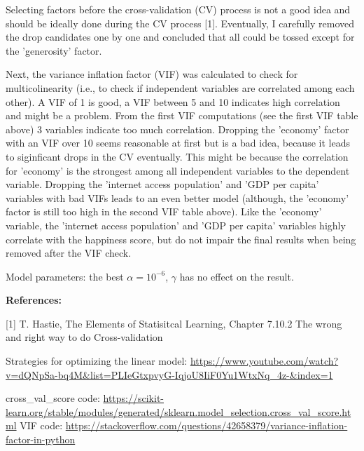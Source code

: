 \documentclass[11pt]{article}
\begin{document}
Selecting factors before the cross-validation (CV) process is not a good
idea and should be ideally done during the CV process {[}1{]}.
Eventually, I carefully removed the drop candidates one by one and
concluded that all could be tossed except for the 'generosity' factor.

Next, the variance inflation factor (VIF) was calculated to check for
multicolinearity (i.e., to check if independent variables are correlated
among each other). A VIF of 1 is good, a VIF between 5 and 10 indicates
high correlation and might be a problem. From the first VIF computations
(see the first VIF table above) 3 variables indicate too much
correlation.\newline
Dropping the 'economy' factor with an VIF over 10 seems reasonable at
first but is a bad idea, because it leads to siginficant drops in the CV
eventually. This might be because the correlation for 'economy' is the
strongest among all independent variables to the dependent variable.
Dropping the 'internet access population' and 'GDP per capita' variables
with bad VIFs leads to an even better model (although, the 'economy'
factor is still too high in the second VIF table above). Like the
'economy' variable, the 'internet access population' and 'GDP per
capita' variables highly correlate with the happiness score, but do not
impair the final results when being removed after the VIF check.\newline

Model parameters: the best \(\alpha = 10^{-6}\), \(\gamma\) has no
effect on the result.\newline

\textbf{References:}\newline

{[}1{]} T. Hastie, The Elements of Statisitcal Learning, Chapter 7.10.2
The wrong and right way to do Cross-validation\newline

Strategies for optimizing the linear model:\newline
\url{https://www.youtube.com/watch?v=dQNpSa-bq4M&list=PLIeGtxpvyG-IqjoU8IiF0Yu1WtxNq_4z-&index=1}\newline

cross\_val\_score code:\newline
\url{https://scikit-learn.org/stable/modules/generated/sklearn.model_selection.cross_val_score.html}\newline
VIF code:\newline
\url{https://stackoverflow.com/questions/42658379/variance-inflation-factor-in-python}\newline
\end{document}
